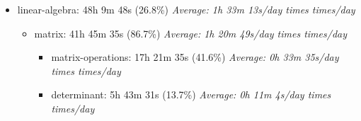 \documentclass[12pt]{extarticle}
\begin{document}
\begin{itemize}[topsep=0pt, itemsep=-0.5ex]
\begin{itemize}[topsep=0pt, itemsep=-0.5ex]
\begin{itemize}[topsep=0pt, itemsep=-0.5ex]
\begin{itemize}[topsep=0pt, itemsep=-0.5ex]
        \textit{Average: 0h 13m 32s/day  times  times/day}\par
    \item discrete-random-variable: 5h 58m 29s (28.6\%)
        \textit{Average: 0h 11m 33s/day  times  times/day}\par
\end{itemize}
    \item probability-basics: 19h 10m 14s (21.5\%)
        \textit{Average: 0h 37m 6s/day  times  times/day}\par
\begin{itemize}[topsep=0pt, itemsep=-0.5ex]
    \item conditional-probability: 11h 6m 44s (58.0\%)
        \textit{Average: 0h 21m 30s/day  times  times/day}\par
    \item random-events: 5h 58m 14s (31.1\%)
        \textit{Average: 0h 11m 33s/day  times  times/day}\par
    \item probability-operations: 0h 37m 20s (3.2\%)
        \textit{Average: 0h 1m 12s/day  times  times/day}\par
\end{itemize}
\end{itemize}
    \item linear-algebra: 48h 9m 48s (26.8\%)
        \textit{Average: 1h 33m 13s/day  times  times/day}\par
\begin{itemize}[topsep=0pt, itemsep=-0.5ex]
    \item matrix: 41h 45m 35s (86.7\%)
        \textit{Average: 1h 20m 49s/day  times  times/day}\par
\begin{itemize}[topsep=0pt, itemsep=-0.5ex]
    \item matrix-operations: 17h 21m 35s (41.6\%)
        \textit{Average: 0h 33m 35s/day  times  times/day}\par
    \item determinant: 5h 43m 31s (13.7\%)
        \textit{Average: 0h 11m 4s/day  times  times/day}\par

\end{itemize}
\end{itemize}
\end{itemize}
\end{itemize}
\end{document}
